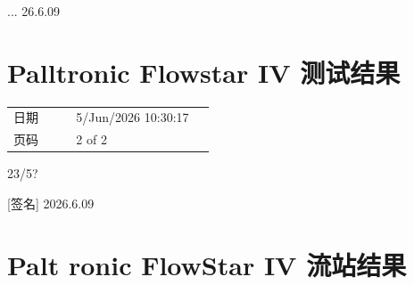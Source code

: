 \documentclass[UTF8,10pt,a4paper,fontset=fandol]{ctexart}
\newcommand{\fieldvalue}[1]{#1}
\newcommand{\handwritten}[1]{#1}
\begin{document}
\handwritten{... 26.6.09}

\section{Palltronic Flowstar IV 测试结果}

\begin{tabular}{@{}p{0.28\linewidth}p{0.62\linewidth}@{}}
日期 &
\fieldvalue{5/Jun/2026 10:30:17}
\\
页码 &
\fieldvalue{2 of 2}
\\
\end{tabular}

\medskip

\noindent
\begin{minipage}{0.82\linewidth}
\centering
{}
\end{minipage}

\medskip

\handwritten{23/5?}

\handwritten{[签名] 2026.6.09}

\newpage

\section{Palt ronic FlowStar IV 流站结果}
\end{document}
